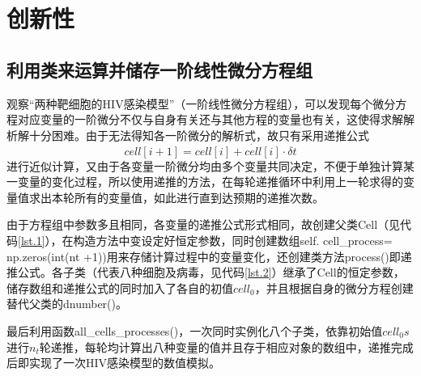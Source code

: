\documentclass{ctexart}
\begin{document}
\section{创新性}
\subsection{利用类来运算并储存一阶线性微分方程组}
观察“两种靶细胞的HIV感染模型”（一阶线性微分方程组），可以发现每个微分方程对应变量的一阶微分不仅与自身有关还与其他方程的变量也有关，这使得求解解析解十分困难。由于无法得知各一阶微分的解析式，故只有采用递推公式$$cell[i+1]=cell[i]+\dot{cell}[i]\cdot \delta t$$进行近似计算，又由于各变量一阶微分均由多个变量共同决定，不便于单独计算某一变量的变化过程，所以使用递推的方法，在每轮递推循环中利用上一轮求得的变量值求出本轮所有的变量值，如此进行直到达预期的递推次数。

由于方程组中参数多且相同，各变量的递推公式形式相同，故创建父类Cell（见代码\ref{lst.1}），在构造方法中变设定好恒定参数，同时创建数组self. cell\_process= np.zeros(int(nt +1))用来存储计算过程中的变量变化，还创建类方法process()即递推公式。各子类（代表八种细胞及病毒，见代码\ref{lst.2}）继承了Cell的恒定参数，储存数组和递推公式的同时加入了各自的初值$cell_{0}$，并且根据自身的微分方程创建替代父类的dnumber()。

最后利用函数all\_cells\_processes()，一次同时实例化八个子类，依靠初始值$cell_{0}s$进行$n_{t}$轮递推，每轮均计算出八种变量的值并且存于相应对象的数组中，递推完成后即实现了一次HIV感染模型的数值模拟。
\end{document}
